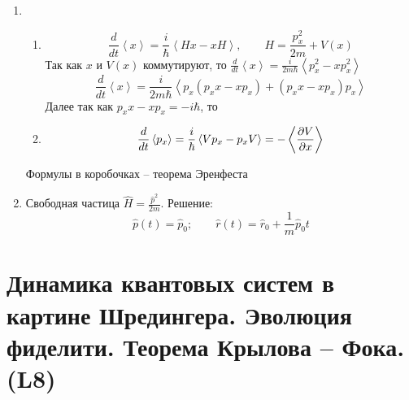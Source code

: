\documentclass[12pt]{customArticle}
\begin{document}
\begin{enumerate}[label=\asbuk*)]
			\item {
				\begin{enumerate}[label=\arabic*)]
					\item{
						\[
							\frac{d}{dt} \left< x \right> = \frac{i}{\hbar} \left< Hx - xH\right>, \qquad H = \frac{p^2_x}{2m} + V(x)
						\]
						Так как $x$ и $V(x)$ коммутируют, то $\frac{d}{dt} \left< x \right> = \frac{i}{2m \hbar} \left< p^2_x - x p^2_x\right> $
						\[
							\frac{d}{dt} \left< x \right> = \frac{i}{2m \hbar} \left< p_x \left(p_x x - x p_x\right) + \left(p_x x - x p_x\right) p_x \right>
						\]
						Далее так как $p_x x - x p_x = -i \hbar$, то 
					}
					\item{
						\[
							\frac{d}{dt} \left< p_x \right> = \frac{i}{\hbar} \left< V p_x - p_x V \right> = - \Braket{\frac{\partial V}{\partial x}}
						\]
						\begin{center}
						\end{center}
					}
				\end{enumerate}
				Формулы в коробочках -- теорема Эренфеста
			}
			\item{
				Свободная частица $\displaystyle \widehat H = \frac{\widehat p^2}{2m}$. Решение: 
				\[
					\widehat p (t) = \widehat p_0; \qquad \widehat r (t) = \widehat r_0 + \frac{1}{m} \widehat p_0 t
				\]
			}
		\end{enumerate}
		
	\section{Динамика квантовых систем в картине Шредингера. Эволюция фиделити. Теорема Крылова – Фока. (L8)}
	
\end{document}
